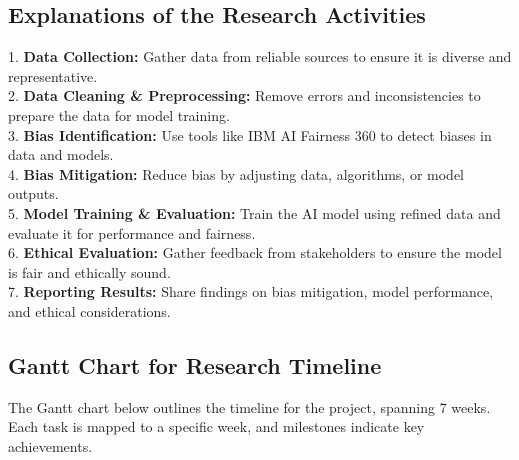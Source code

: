 \documentclass[a4paper, 12pt]{article}
\begin{document}

\subsection*{Explanations of the Research Activities}
1. \textbf{Data Collection:} Gather data from reliable sources to ensure it is diverse and representative. \\
2. \textbf{Data Cleaning \& Preprocessing:} Remove errors and inconsistencies to prepare the data for model training. \\
3. \textbf{Bias Identification:} Use tools like IBM AI Fairness 360 to detect biases in data and models. \\
4. \textbf{Bias Mitigation:} Reduce bias by adjusting data, algorithms, or model outputs. \\
5. \textbf{Model Training \& Evaluation:} Train the AI model using refined data and evaluate it for performance and fairness. \\
6. \textbf{Ethical Evaluation:} Gather feedback from stakeholders to ensure the model is fair and ethically sound. \\
7. \textbf{Reporting Results:} Share findings on bias mitigation, model performance, and ethical considerations.

\subsection*{Gantt Chart for Research Timeline}
The Gantt chart below outlines the timeline for the project, spanning 7 weeks. Each task is mapped to a specific week, and milestones indicate key achievements.
\end{document}
